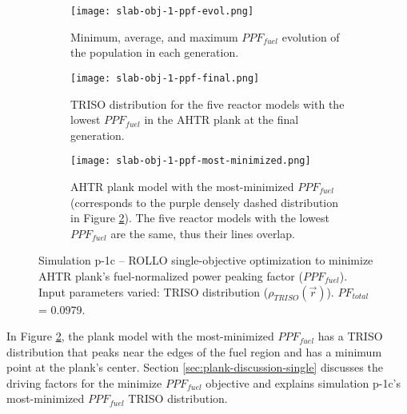 \begin{figure}[htbp!]
    \centering
    \begin{subfigure}{0.9\textwidth}
        \texttt{[image: slab-obj-1-ppf-evol.png]}
        \caption{Minimum, average, and maximum $PPF_{fuel}$ evolution of the 
        population in each generation.}
        \label{fig:slab-obj-1-ppf-evol} 
    \end{subfigure}
    \begin{subfigure}{0.9\textwidth}
        \texttt{[image: slab-obj-1-ppf-final.png]}
        \caption{TRISO distribution for the five reactor models with the 
        lowest $PPF_{fuel}$ in the AHTR plank at the final generation.}
        \label{fig:slab-obj-1-ppf-final} 
    \end{subfigure}
    \begin{subfigure}{0.9\textwidth}
        \texttt{[image: slab-obj-1-ppf-most-minimized.png]}
        \caption{\gls{AHTR} plank model with the most-minimized $PPF_{fuel}$
        (corresponds to the purple densely dashed distribution in Figure 
        \ref{fig:slab-obj-1-ppf-final}).
        The five reactor models with the lowest $PPF_{fuel}$ are the same, thus 
        their lines overlap.}
        \label{fig:slab-obj-1-ppf-most-minimized} 
    \end{subfigure}
    \caption{Simulation p-1c -- ROLLO single-objective optimization to minimize 
    AHTR plank's fuel-normalized power peaking factor ($PPF_{fuel}$). 
    Input parameters varied: TRISO distribution ($\rho_{TRISO}(\vec{r})$).
    $PF_{total}$ = 0.0979.}
    \label{fig:slab-obj-1-ppf}
\end{figure}
In Figure \ref{fig:slab-obj-1-ppf-final}, the plank model with the most-minimized 
$PPF_{fuel}$ has a TRISO distribution that peaks near the edges of the fuel region and 
has a minimum point at the plank's center.
Section \ref{sec:plank-discussion-single} discusses the driving factors for the minimize 
$PPF_{fuel}$ objective and explains simulation p-1c's most-minimized $PPF_{fuel}$ 
TRISO distribution. 

